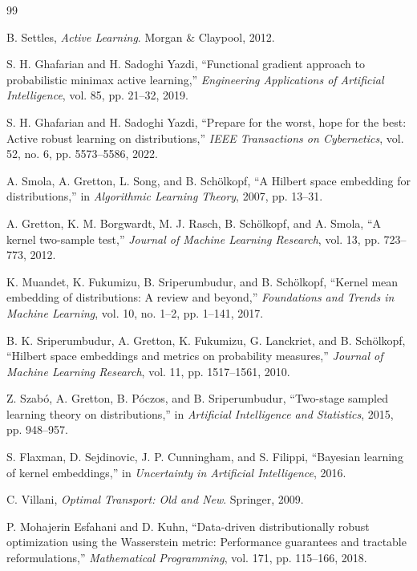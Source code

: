 \documentclass[10pt,journal]{IEEEtran}
\begin{document}
\balance

\begin{thebibliography}{99}

B. Settles, \emph{Active Learning}. Morgan \& Claypool, 2012.

S. H. Ghafarian and H. Sadoghi Yazdi, ``Functional gradient approach to probabilistic minimax active learning,'' \emph{Engineering Applications of Artificial Intelligence}, vol. 85, pp. 21--32, 2019.

S. H. Ghafarian and H. Sadoghi Yazdi, ``Prepare for the worst, hope for the best: Active robust learning on distributions,'' \emph{IEEE Transactions on Cybernetics}, vol. 52, no. 6, pp. 5573--5586, 2022.

A. Smola, A. Gretton, L. Song, and B. Sch{\"o}lkopf, ``A Hilbert space embedding for distributions,'' in \emph{Algorithmic Learning Theory}, 2007, pp. 13--31.

A. Gretton, K. M. Borgwardt, M. J. Rasch, B. Sch{\"o}lkopf, and A. Smola, ``A kernel two-sample test,'' \emph{Journal of Machine Learning Research}, vol. 13, pp. 723--773, 2012.

K. Muandet, K. Fukumizu, B. Sriperumbudur, and B. Sch{\"o}lkopf, ``Kernel mean embedding of distributions: A review and beyond,'' \emph{Foundations and Trends in Machine Learning}, vol. 10, no. 1--2, pp. 1--141, 2017.

B. K. Sriperumbudur, A. Gretton, K. Fukumizu, G. Lanckriet, and B. Sch{\"o}lkopf, ``Hilbert space embeddings and metrics on probability measures,'' \emph{Journal of Machine Learning Research}, vol. 11, pp. 1517--1561, 2010.

Z. Szab{\'o}, A. Gretton, B. P{\'o}czos, and B. Sriperumbudur, ``Two-stage sampled learning theory on distributions,'' in \emph{Artificial Intelligence and Statistics}, 2015, pp. 948--957.

S. Flaxman, D. Sejdinovic, J. P. Cunningham, and S. Filippi, ``Bayesian learning of kernel embeddings,'' in \emph{Uncertainty in Artificial Intelligence}, 2016.

C. Villani, \emph{Optimal Transport: Old and New}. Springer, 2009.

P. Mohajerin Esfahani and D. Kuhn, ``Data-driven distributionally robust optimization using the Wasserstein metric: Performance guarantees and tractable reformulations,'' \emph{Mathematical Programming}, vol. 171, pp. 115--166, 2018.


\end{thebibliography}
\end{document}
